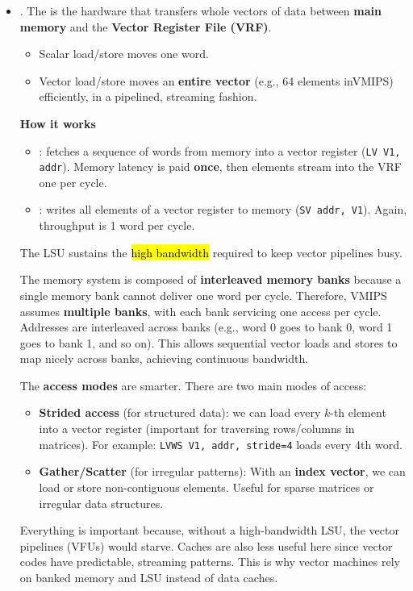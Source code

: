 \begin{itemize}
    \item {}. The  is the hardware that transfers whole vectors of data between \textbf{main memory} and the \textbf{Vector Register File (VRF)}.
    \begin{itemize}
        \item Scalar load/store moves one word.
        \item Vector load/store moves an \textbf{entire vector} (e.g., 64 elements in\break VMIPS) efficiently, in a pipelined, streaming fashion.
    \end{itemize}
    \textcolor{Green3}{ \textbf{How it works}}
    \begin{itemize}
        \item {}: fetches a sequence of words from memory into a vector register (\texttt{LV V1, addr}). Memory latency is paid \textbf{once}, then elements stream into the VRF one per cycle.
        \item {}: writes all elements of a vector register to memory (\texttt{SV addr, V1}). Again, throughput is 1 word per cycle.
    \end{itemize}
    The LSU sustains the \hl{high bandwidth} required to keep vector pipelines busy. 

    \highspace
    The memory system is composed of \textbf{interleaved memory banks} because a single memory bank cannot deliver one word per cycle. Therefore, VMIPS assumes \textbf{multiple banks}, with each bank servicing one access per cycle. Addresses are interleaved across banks (e.g., word 0 goes to bank 0, word 1 goes to bank 1, and so on). This allows sequential vector loads and stores to map nicely across banks, achieving continuous bandwidth.

    \newpage

    The \textbf{access modes} are smarter. There are two main modes of access:
    \begin{itemize}
        \item \textbf{Strided access} (for structured data): we can load every $k$-th element into a vector register (important for traversing rows/columns in matrices). For example: \texttt{LVWS V1, addr, stride=4} loads every 4th word.
        \item \textbf{Gather/Scatter} (for irregular patterns): With an \textbf{index vector}, we can load or store non-contiguous elements. Useful for sparse matrices or irregular data structures.
    \end{itemize}
    Everything is important because, without a high-bandwidth LSU, the vector pipelines (VFUs) would starve. Caches are also less useful here since vector codes have predictable, streaming patterns. This is why vector machines rely on banked memory and LSU instead of data caches.



\end{itemize}
